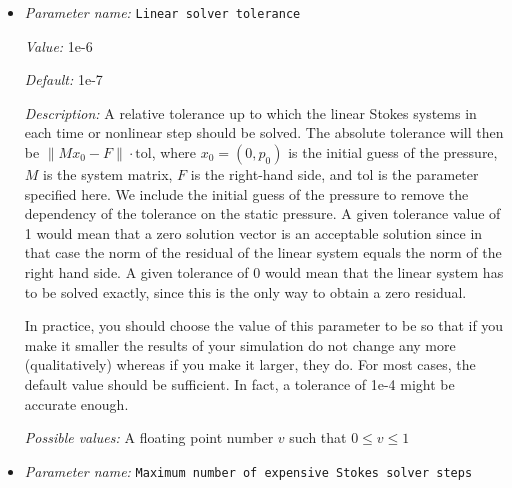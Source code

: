 \begin{itemize}
{\it Value:} 1e-6


{\it Default:} 1e-6


{\it Description:} A relative tolerance up to which the approximate inverse of the $S$ block (i.e., the Schur complement matrix $S = BA^{-1}B^{T}$) of the Stokes system is computed. This approximate inverse of the $S$ block is used in the preconditioning used in the GMRES solver. The exact definition of this block preconditioner for the Stokes equation can be found in \cite{KHB12}.


{\it Possible values:} A floating point number $v$ such that $0 \leq v \leq 1$
\item {\it Parameter name:} {\tt Linear solver tolerance}
\label{parameters:Solver parameters/Stokes solver parameters/Linear solver tolerance}
\label{parameters:Solver_20parameters/Stokes_20solver_20parameters/Linear_20solver_20tolerance}


{\it Value:} 1e-6


{\it Default:} 1e-7


{\it Description:} A relative tolerance up to which the linear Stokes systems in each time or nonlinear step should be solved. The absolute tolerance will then be $\| M x_0 - F \| \cdot \text{tol}$, where $x_0 = (0,p_0)$ is the initial guess of the pressure, $M$ is the system matrix, $F$ is the right-hand side, and tol is the parameter specified here. We include the initial guess of the pressure to remove the dependency of the tolerance on the static pressure. A given tolerance value of 1 would mean that a zero solution vector is an acceptable solution since in that case the norm of the residual of the linear system equals the norm of the right hand side. A given tolerance of 0 would mean that the linear system has to be solved exactly, since this is the only way to obtain a zero residual.

In practice, you should choose the value of this parameter to be so that if you make it smaller the results of your simulation do not change any more (qualitatively) whereas if you make it larger, they do. For most cases, the default value should be sufficient. In fact, a tolerance of 1e-4 might be accurate enough.


{\it Possible values:} A floating point number $v$ such that $0 \leq v \leq 1$
\item {\it Parameter name:} {\tt Maximum number of expensive Stokes solver steps}
\label{parameters:Solver parameters/Stokes solver parameters/Maximum number of expensive Stokes solver steps}
\label{parameters:Solver_20parameters/Stokes_20solver_20parameters/Maximum_20number_20of_20expensive_20Stokes_20solver_20steps}



\end{itemize}
